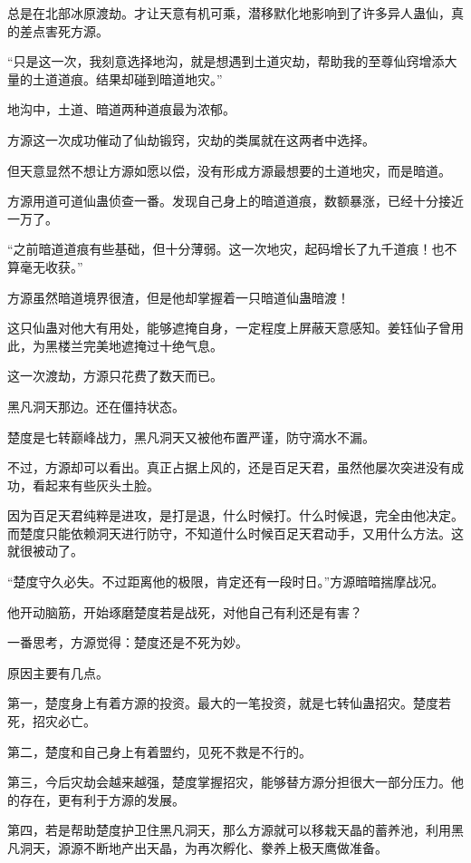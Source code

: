 \begin{this_body}
总是在北部冰原渡劫。才让天意有机可乘，潜移默化地影响到了许多异人蛊仙，真的差点害死方源。

“只是这一次，我刻意选择地沟，就是想遇到土道灾劫，帮助我的至尊仙窍增添大量的土道道痕。结果却碰到暗道地灾。”

地沟中，土道、暗道两种道痕最为浓郁。

方源这一次成功催动了仙劫锻窍，灾劫的类属就在这两者中选择。

但天意显然不想让方源如愿以偿，没有形成方源最想要的土道地灾，而是暗道。

方源用道可道仙蛊侦查一番。发现自己身上的暗道道痕，数额暴涨，已经十分接近一万了。

“之前暗道道痕有些基础，但十分薄弱。这一次地灾，起码增长了九千道痕！也不算毫无收获。”

方源虽然暗道境界很渣，但是他却掌握着一只暗道仙蛊暗渡！

这只仙蛊对他大有用处，能够遮掩自身，一定程度上屏蔽天意感知。姜钰仙子曾用此，为黑楼兰完美地遮掩过十绝气息。

这一次渡劫，方源只花费了数天而已。

黑凡洞天那边。还在僵持状态。

楚度是七转巅峰战力，黑凡洞天又被他布置严谨，防守滴水不漏。

不过，方源却可以看出。真正占据上风的，还是百足天君，虽然他屡次突进没有成功，看起来有些灰头土脸。

因为百足天君纯粹是进攻，是打是退，什么时候打。什么时候退，完全由他决定。而楚度只能依赖洞天进行防守，不知道什么时候百足天君动手，又用什么方法。这就很被动了。

“楚度守久必失。不过距离他的极限，肯定还有一段时日。”方源暗暗揣摩战况。

他开动脑筋，开始琢磨楚度若是战死，对他自己有利还是有害？

一番思考，方源觉得：楚度还是不死为妙。

原因主要有几点。

第一，楚度身上有着方源的投资。最大的一笔投资，就是七转仙蛊招灾。楚度若死，招灾必亡。

第二，楚度和自己身上有着盟约，见死不救是不行的。

第三，今后灾劫会越来越强，楚度掌握招灾，能够替方源分担很大一部分压力。他的存在，更有利于方源的发展。

第四，若是帮助楚度护卫住黑凡洞天，那么方源就可以移栽天晶的蓄养池，利用黑凡洞天，源源不断地产出天晶，为再次孵化、豢养上极天鹰做准备。


\end{this_body}
